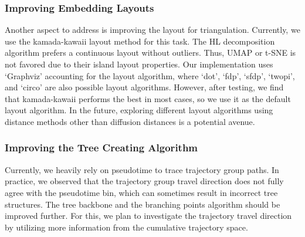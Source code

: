 \subsubsection{Improving Embedding Layouts}
Another aspect to address is improving the layout for triangulation. Currently, we use the kamada-kawaii layout method for this task. The HL decomposition algorithm prefers a continuous layout without outliers. Thus, UMAP or t-SNE is not favored due to their island layout properties. Our implementation uses `Graphviz' accounting for the layout algorithm, where `dot', `fdp', `sfdp', `twopi', and `circo' are also possible layout algorithms. However, after testing, we find that kamada-kawaii performs the best in most cases, so we use it as the default layout algorithm. In the future, exploring different layout algorithms using distance methods other than diffusion distances is a potential avenue.

\subsubsection{Improving the Tree Creating Algorithm}
Currently, we heavily rely on pseudotime to trace trajectory group paths. In practice, we observed that the trajectory group travel direction does not fully agree with the pseudotime bin, which can sometimes result in incorrect tree structures. The tree backbone and the branching points algorithm should be improved further. For this, we plan to investigate the trajectory travel direction by utilizing more information from the cumulative trajectory space.

